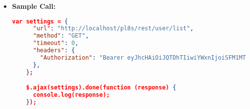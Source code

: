 \begin{itemize}
    \item \textbf{Sample Call:}
		\begin{lstlisting}[language=json]		
    var settings = {
      "url": "http://localhost/pl8s/rest/user/list",
      "method": "GET",
      "timeout": 0,
      "headers": {
        "Authorization": "Bearer eyJhcHAiOiJQTDhTIiwiYWxnIjoiSFM1MTIifQ.eyJ1aWQiOjEsInJvbCI6ImFkbWluIiwic3Ry IjoiY3VzX1B3OHAyQlk2YkZYMm1iIiwiZGF0IjoxNzE0MzIwOTY0NzI5fQ.T1y3Lufb8wi1AxP6 uymJ UrEDKo5dfgUe0seNIdsSw6yGQ_2R0awineJsMSa9TQu6lIy8dSH12JO9LPNzGtVJkg"
      },
    };

    $.ajax(settings).done(function (response) {
      console.log(response);
    });
	\end{lstlisting}
  \end{itemize}		
